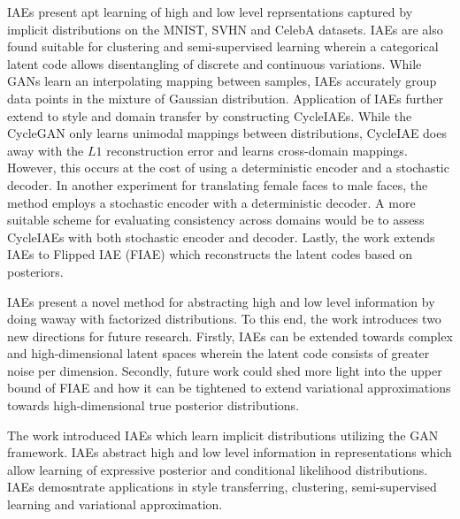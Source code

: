 \documentclass[11pt,letterpaper]{article}
\begin{document}
IAEs present apt learning of high and low level reprsentations captured by implicit distributions on the MNIST, SVHN and CelebA datasets. IAEs are also found suitable for clustering and semi-supervised learning wherein a categorical latent code allows disentangling of discrete and continuous variations. While GANs learn an interpolating mapping between samples, IAEs accurately group data points in the mixture of Gaussian distribution. Application of IAEs further extend to style and domain transfer by constructing CycleIAEs. While the CycleGAN only learns unimodal mappings between distributions, CycleIAE does away with the $L1$ reconstruction error and learns cross-domain mappings. However, this occurs at the cost of using a deterministic encoder and a stochastic decoder. In another experiment for translating female faces to male faces, the method employs a stochastic encoder with a deterministic decoder. A more suitable scheme for evaluating consistency across domains would be to assess CycleIAEs with both stochastic encoder and decoder. Lastly, the work extends IAEs to Flipped IAE (FIAE) which reconstructs the latent codes based on posteriors.

IAEs present a novel method for abstracting high and low level information by doing waway with factorized distributions. To this end, the work introduces two new directions for future research. Firstly, IAEs can be extended towards complex and high-dimensional latent spaces wherein the latent code consists of greater noise per dimension. Secondly, future work could shed more light into the upper bound of FIAE and how it can be tightened to extend variational approximations towards high-dimensional true posterior distributions. 

The work introduced IAEs which learn implicit distributions utilizing the GAN framework. IAEs abstract high and low level information in representations which allow learning of expressive posterior and conditional likelihood distributions. IAEs demosntrate applications in style transferring, clustering, semi-supervised learning and variational approximation. 
\end{document}
